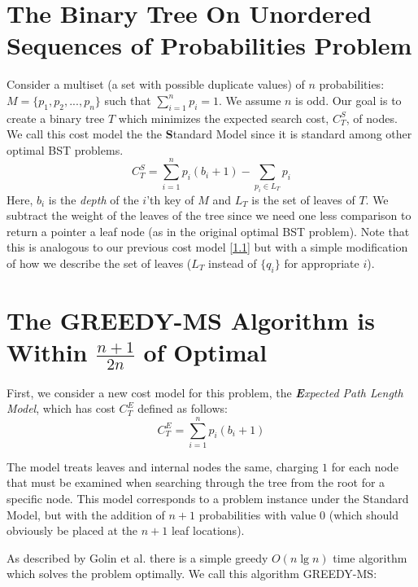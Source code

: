 \documentclass[letterpaper,12pt,titlepage,oneside,final]{book}
\theoremstyle{plain}
\begin{document}
\section{The Binary Tree On Unordered Sequences of Probabilities Problem}\label{The Multiset Binary Search Tree Problem}

 Consider a multiset (a set with possible duplicate values) of $n$ probabilities: $M = \{ p_1, p_2, ..., p_n \}$ such that $\sum\limits_{i=1}^n p_i = 1$. We assume $n$ is odd. Our goal is to create a binary tree $T$ which minimizes the expected search cost, $C^S_T$, of nodes. We call this cost model the  the \textbf{S}tandard Model since it is standard among other optimal BST problems.
\begin{equation}
C^S_T = \sum_{i=1}^{n} p_i(b_i+1) - \sum_{p_i \in L_T} p_i
\end{equation}
Here, $b_i$ is the \emph{depth} of the $i$'th key of $M$ and $L_T$ is the set of leaves of $T$. We subtract the weight of the leaves of the tree since we need one less comparison to return a pointer a leaf node (as in the original optimal BST problem). Note that this is analogous to our previous cost model \ref{1.1} but with a simple modification of how we describe the set of leaves ($L_T$ instead of $\{q_i\}$ for appropriate $i$).

\section{The GREEDY-MS Algorithm is Within $\frac{n+1}{2n}$ of Optimal}\label{GREEDY-MS}

First, we consider a new cost model for this problem, the \textit{\textbf{E}xpected Path Length Model}, which has cost $C^E_T$ defined as follows:
\begin{equation}
C^E_T = \sum_{i=1}^{n} p_i(b_i+1)
\end{equation}

The model treats leaves and internal nodes the same, charging $1$ for each node that must be examined when searching through the tree from the root for a specific node. This model corresponds to a problem instance under the Standard Model, but with the addition of $n+1$ probabilities with value $0$ (which should obviously be placed at the $n+1$ leaf locations).

As described by Golin et al. \cite{golin2012huffman} there is a simple greedy $O(n \lg n)$ time algorithm which solves the problem optimally. We call this algorithm GREEDY-MS:
\end{document}
